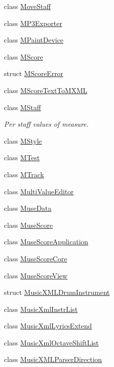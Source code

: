 \begin{DoxyCompactItemize}
\item 
class \hyperlink{class_ms_1_1_move_staff}{Move\+Staff}
\item 
class \hyperlink{class_ms_1_1_m_p3_exporter}{M\+P3\+Exporter}
\item 
class \hyperlink{class_ms_1_1_m_paint_device}{M\+Paint\+Device}
\item 
class \hyperlink{class_ms_1_1_m_score}{M\+Score}
\item 
struct \hyperlink{struct_ms_1_1_m_score_error}{M\+Score\+Error}
\item 
class \hyperlink{class_ms_1_1_m_score_text_to_m_x_m_l}{M\+Score\+Text\+To\+M\+X\+ML}
\item 
class \hyperlink{class_ms_1_1_m_staff}{M\+Staff}
\begin{DoxyCompactList}\small\item\em Per staff values of measure. \end{DoxyCompactList}\item 
class \hyperlink{class_ms_1_1_m_style}{M\+Style}
\item 
class \hyperlink{class_ms_1_1_m_test}{M\+Test}
\item 
class \hyperlink{class_ms_1_1_m_track}{M\+Track}
\item 
class \hyperlink{class_ms_1_1_multi_value_editor}{Multi\+Value\+Editor}
\item 
class \hyperlink{class_ms_1_1_muse_data}{Muse\+Data}
\item 
class \hyperlink{class_ms_1_1_muse_score}{Muse\+Score}
\item 
class \hyperlink{class_ms_1_1_muse_score_application}{Muse\+Score\+Application}
\item 
class \hyperlink{class_ms_1_1_muse_score_core}{Muse\+Score\+Core}
\item 
class \hyperlink{class_ms_1_1_muse_score_view}{Muse\+Score\+View}
\item 
struct \hyperlink{struct_ms_1_1_music_x_m_l_drum_instrument}{Music\+X\+M\+L\+Drum\+Instrument}
\item 
class \hyperlink{class_ms_1_1_music_xml_instr_list}{Music\+Xml\+Instr\+List}
\item 
class \hyperlink{class_ms_1_1_music_xml_lyrics_extend}{Music\+Xml\+Lyrics\+Extend}
\item 
class \hyperlink{class_ms_1_1_music_xml_octave_shift_list}{Music\+Xml\+Octave\+Shift\+List}
\item 
class \hyperlink{class_ms_1_1_music_x_m_l_parser_direction}{Music\+X\+M\+L\+Parser\+Direction}

\end{DoxyCompactItemize}
